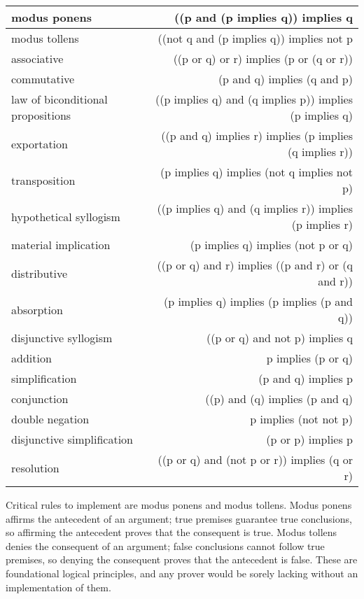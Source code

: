 \documentclass{l4proj}
\begin{document}
\begin{tabular}{| l | r |} 
\hline modus ponens & ((p and (p implies q)) implies q \\
\hline modus tollens & ((not q and (p implies q)) implies not p \\
\hline associative & ((p or q) or r) implies (p or (q or r)) \\
\hline commutative & (p and q) implies (q and p) \\
\hline law of biconditional propositions & ((p implies q) and (q implies p)) implies (p implies q) \\
\hline exportation & ((p and q) implies r) implies (p implies (q implies r)) \\
\hline transposition & (p implies q) implies (not q implies not p) \\
\hline hypothetical syllogism & ((p implies q) and (q implies r)) implies (p implies r) \\
\hline material implication & (p implies q) implies (not p or q) \\
\hline distributive & ((p or q) and r) implies ((p and r) or (q and r)) \\
\hline absorption & (p implies q) implies (p implies (p and q)) \\
\hline disjunctive syllogism & ((p or q) and not p) implies q \\
\hline addition & p implies (p or q) \\
\hline simplification & (p and q) implies p \\
\hline conjunction & ((p) and (q) implies (p and q) \\
\hline double negation & p implies (not not p) \\
\hline disjunctive simplification & (p or p) implies p \\
\hline resolution & ((p or q) and (not p or r)) implies (q or r) \\
\hline
\end{tabular}

Critical rules to implement are modus ponens and modus tollens. Modus ponens affirms the antecedent of an argument; true premises guarantee true conclusions, so affirming the antecedent proves that the consequent is true. Modus tollens denies the consequent of an argument; false conclusions cannot follow true premises, so denying the consequent proves that the antecedent is false. These are foundational logical principles, and any prover would be sorely lacking without an implementation of them. 
\end{document}
